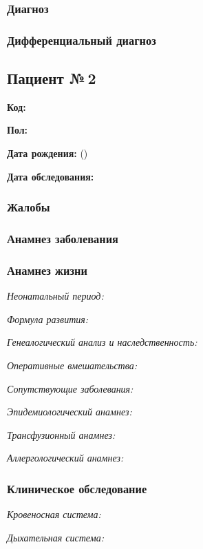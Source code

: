 \documentclass[a4paper,14pt]{extarticle}
\begin{document}
\subsubsection*{Диагноз}

\subsubsection*{Дифференциальный диагноз}

\newpage
\subsection*{Пациент №\,2}

\textbf{Код:} 

\textbf{Пол:}

\textbf{Дата рождения:}  ()

\textbf{Дата обследования:} 

\subsubsection*{Жалобы}

\subsubsection*{Анамнез заболевания}

\subsubsection*{Анамнез жизни}

\emph{Неонатальный период:}

\emph{Формула развития:}

\emph{Генеалогический анализ и наследственность:}

\emph{Оперативные вмешательства:}

\emph{Сопутствующие заболевания:}

\emph{Эпидемиологический анамнез:}

\emph{Трансфузионный анамнез:}

\emph{Аллергологический анамнез:}

\subsubsection*{Клиническое обследование}

\emph{Кровеносная система:}

\emph{Дыхательная система:}
\end{document}
